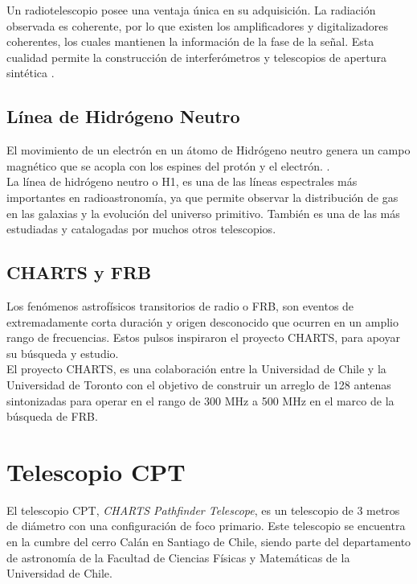 Un radiotelescopio posee una ventaja única en su adquisición. La radiación observada es coherente, por lo que existen los amplificadores y digitalizadores coherentes, los cuales mantienen la información de la fase de la señal. Esta cualidad permite la construcción de interferómetros y telescopios de apertura sintética \cite{Ransom2016}.\\ 

\subsection{Línea de Hidrógeno Neutro}

El movimiento de un electrón en un átomo de Hidrógeno neutro genera un campo magnético que se acopla con los espines del protón y el electrón.  \cite{Restrepo2023}.\\

La línea de hidrógeno neutro o H1, es una de las líneas espectrales más importantes en radioastronomía, ya que permite observar la distribución de gas en las galaxias y la evolución del universo primitivo. También es una de las más estudiadas y catalogadas por muchos otros telescopios.\\

\subsection{CHARTS y FRB}

Los fenómenos astrofísicos transitorios de radio o FRB, son eventos de extremadamente corta duración y origen desconocido que ocurren en un amplio rango de frecuencias. Estos pulsos inspiraron el proyecto CHARTS, para apoyar su búsqueda y estudio.\\

El proyecto CHARTS, es una colaboración entre la Universidad de Chile y la Universidad de Toronto con el objetivo de construir un arreglo de 128 antenas sintonizadas para operar en el rango de 300 MHz a 500 MHz en el marco de la búsqueda de FRB.\\


\section{Telescopio CPT}

El telescopio CPT, \textit{CHARTS Pathfinder Telescope}, es un telescopio de 3 metros de diámetro con una configuración de foco primario. Este telescopio se encuentra en la cumbre del cerro Calán en Santiago de Chile, siendo parte del departamento de astronomía de la Facultad de Ciencias Físicas y Matemáticas de la Universidad de Chile.\\

